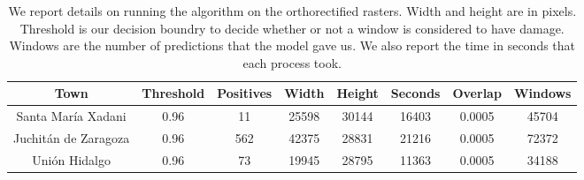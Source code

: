 \begin{table}[h!]
  \centering
  \caption{We report details on running the algorithm on the orthorectified rasters. Width and height are in pixels. Threshold is our decision boundry to decide whether or not a window is considered to have damage. Windows are the number of predictions that the model gave us. We also report the time in seconds that each process took.}
  \begin{tabular}{|c|c|c|c|c|c|c|c|}
    \hline
    Town                 &Threshold&Positives  & Width & Height & Seconds & Overlap &Windows \\ \hline
    Santa Mar\'ia Xadani   &0.96      &11         & 25598 & 30144  & 16403   & 0.0005  &45704 \\ \hline
    Juchit\'an de Zaragoza &0.96      &562        & 42375 & 28831  & 21216   & 0.0005  &72372 \\ \hline
    Uni\'on Hidalgo        &0.96      &73         & 19945 & 28795  & 11363   & 0.0005  &34188 \\
    \hline
  \end{tabular}
  \label{table:results}
\end{table}




